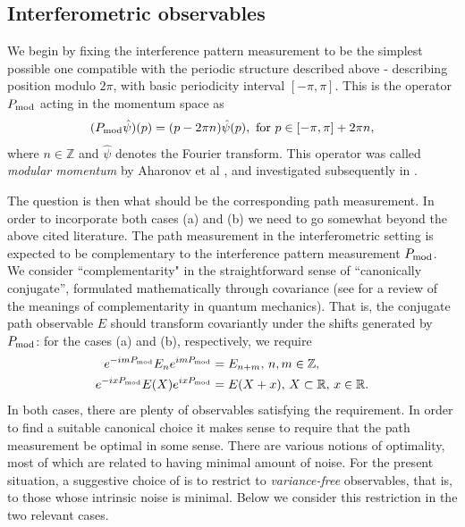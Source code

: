 \subsection{Interferometric observables}

We begin by fixing the interference pattern measurement to be the simplest possible one compatible with the periodic structure described above - describing position modulo $2\pi$, with basic periodicity interval $[-\pi,\pi]$. This is the operator $P_{\mathrm{mod}}$ acting in the momentum space as
\begin{align}
(P_{\mathrm{mod}}\hat\psi)(p) = (p-2\pi n)\hat\psi(p), \text{ for } p\in [-\pi,\pi] +2\pi n,
\end{align}
where $n\in \mathbb Z$ and $\hat \psi$ denotes the Fourier transform. This operator was called \emph{modular momentum} by Aharonov et al \cite{aharonov-modular-variables}, and investigated subsequently in \cite{PhysRevA.90.022115}.

The question is then what should be the corresponding path measurement. In order to incorporate both cases (a) and (b) we need to go somewhat beyond the above cited literature. The path measurement in the interferometric setting is expected to be complementary to the interference pattern measurement $P_{\mathrm{mod}}$. We consider ``complementarity" in the straightforward sense of ``canonically conjugate'', formulated mathematically through covariance (see \cite{Kiukas2019} for a review of the meanings of complementarity in quantum mechanics). That is, the conjugate path observable $E$ should transform covariantly under the shifts generated by $P_{\mathrm{mod}}$: for the cases (a) and (b), respectively, we require
\begin{align}
e^{-im P_{\mathrm{mod}}}E_ne^{im P_{\mathrm{mod}}} &= E_{n+m}, \,n,m\in \mathbb Z, \label{covA}\\
e^{-ix P_{\mathrm{mod}}}E(X)e^{ix P_{\mathrm{mod}}} &= E(X+x), \,X\subset \mathbb R,\,x\in \mathbb R. \label{covB}
\end{align}
In both cases, there are plenty of observables satisfying the requirement. In order to find a suitable canonical choice it makes sense to require that the path measurement be optimal in some sense. There are various notions of optimality, most of which are related to having minimal amount of noise. For the present situation, a suggestive choice of is to restrict to \emph{variance-free} observables, that is, to those whose intrinsic noise is minimal. Below we consider this restriction in the two relevant cases.

